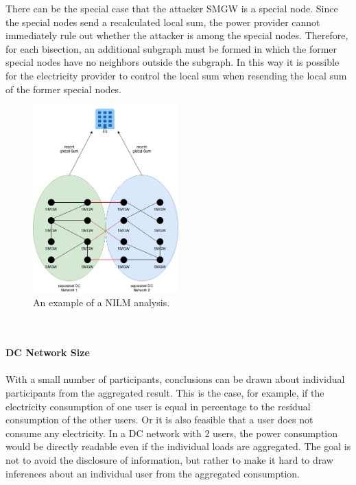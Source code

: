 There can be the special case that the attacker SMGW is a special node. Since the special nodes send a recalculated local sum, the power provider cannot immediately rule out whether the attacker is among the special nodes. Therefore, for each bisection, an additional subgraph must be formed in which the former special nodes have no neighbors outside the subgraph. In this way it is possible for the electricity provider to control the local sum when resending the local sum of the former special nodes.
\begin{figure}[tbp]
  \centering
  \includegraphics[width=0.5\textwidth]{images/DC Net Split.png}
  \caption[Short description]{An example of a NILM analysis.}
  \label{fig:Appliance_Model}
\end{figure}
\\
\\
\textbf{DC Network Size}
\\
\\
With a small number of participants, conclusions can be drawn about individual participants from the aggregated result. This is the case, for example, if the electricity consumption of one user is equal in percentage to the residual consumption of the other users. Or it is also feasible that a user does not consume any electricity. In a DC network with 2 users, the power consumption would be directly readable even if the individual loads are aggregated. The goal is not to avoid the disclosure of information, but rather to make it hard to draw inferences about an individual user from the aggregated consumption.%
